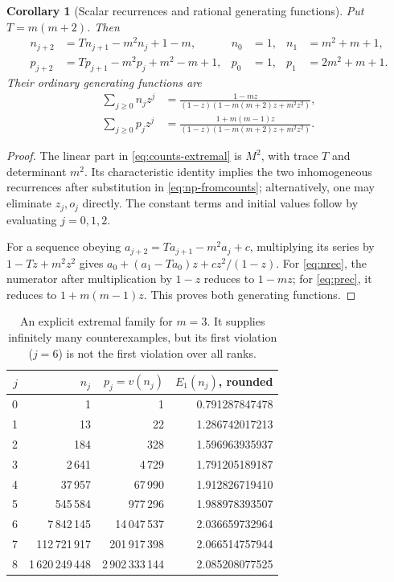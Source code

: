 \documentclass[11pt]{article}
\numberwithin{equation}{section}
\newtheorem{corollary}[theorem]{Corollary}
\theoremstyle{definition}
\theoremstyle{remark}
\begin{document}
\begin{corollary}[Scalar recurrences and rational generating functions]
\label{cor:gf}
Put $T=m(m+2)$. Then
\begin{align}
n_{j+2}&=Tn_{j+1}-m^2n_j+1-m,
& n_0&=1,& n_1&=m^2+m+1,\label{eq:nrec}\\
p_{j+2}&=Tp_{j+1}-m^2p_j+m^2-m+1,
& p_0&=1,& p_1&=2m^2+m+1.\label{eq:prec}
\end{align}
Their ordinary generating functions are
\begin{align}
\sum_{j\ge0}n_jz^j
&=\frac{1-mz}{(1-z)(1-m(m+2)z+m^2z^2)},\label{eq:ngf}\\
\sum_{j\ge0}p_jz^j
&=\frac{1+m(m-1)z}{(1-z)(1-m(m+2)z+m^2z^2)}.\label{eq:pgf}
\end{align}
\end{corollary}
\begin{proof}
The linear part in \eqref{eq:counts-extremal} is $M^2$, with trace
$T$ and determinant $m^2$. Its characteristic identity implies the two
inhomogeneous recurrences after substitution in \eqref{eq:np-fromcounts};
alternatively, one may eliminate $z_j,o_j$ directly. The constant terms
and initial values follow by evaluating $j=0,1,2$.

For a sequence obeying $a_{j+2}=Ta_{j+1}-m^2a_j+c$, multiplying its
series by $1-Tz+m^2z^2$ gives
$a_0+(a_1-Ta_0)z+cz^2/(1-z)$. For \eqref{eq:nrec}, the numerator after
multiplication by $1-z$ reduces to $1-mz$; for \eqref{eq:prec}, it reduces
to $1+m(m-1)z$. This proves both generating functions.
\end{proof}

\begin{table}[htbp]
\centering\small
\begin{tabular}{rrrr}
\toprule
$j$ & $n_j$ & $p_j=v(n_j)$ & $E_1(n_j)$, rounded\\
\midrule
0&1&1&0.791287847478\\
1&13&22&1.286742017213\\
2&184&328&1.596963935937\\
3&2\,641&4\,729&1.791205189187\\
4&37\,957&67\,990&1.912826719410\\
5&545\,584&977\,296&1.988978393507\\
6&7\,842\,145&14\,047\,537&2.036659732964\\
7&112\,721\,917&201\,917\,398&2.066514757944\\
8&1\,620\,249\,448&2\,902\,333\,144&2.085208077525\\
\bottomrule
\end{tabular}
\caption{An explicit extremal family for $m=3$. It supplies infinitely many
counterexamples, but its first violation ($j=6$) is not the first violation
over all ranks.}\label{tab:family}
\end{table}
\end{document}
